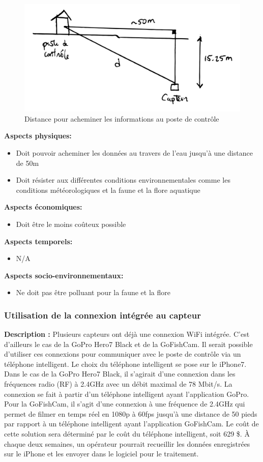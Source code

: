 \begin{figure}[!htb]
    \centering
    \includegraphics[width=0.5\linewidth]{fig/distance_min.png}
    \caption{Distance pour acheminer les informations au poste de contrôle}
    \label{fig:distance_acheminer}
\end{figure}


 \textbf{Aspects physiques:}
 \begin{itemize} [label = {--}]
    \item Doit pouvoir acheminer les données au travers de l'eau jusqu'à une distance de 50m
    \item Doit résister aux différentes conditions environnementales comme les conditions météorologiques et la faune et la flore aquatique
\end{itemize}

 \textbf{Aspects économiques:}
 \begin{itemize} [label = {--}]
    \item Doit être le moins coûteux possible 
\end{itemize}

 \textbf{Aspects temporels:}
 \begin{itemize} [label = {--}]
    \item N/A
\end{itemize}

 \textbf{Aspects socio-environnementaux:}
 \begin{itemize} [label = {--}]
    \item Ne doit pas être polluant pour la faune et la flore
\end{itemize}

\subsubsection{Utilisation de la connexion intégrée au capteur}
\textbf{Description :} Plusieurs capteurs ont déjà une connexion WiFi intégrée. C'est d'ailleurs le cas de la GoPro Hero7 Black et de la GoFishCam. Il serait possible d'utiliser ces connexions pour communiquer avec le poste de contrôle via un téléphone intelligent. Le choix du téléphone intelligent se pose sur le iPhone7. Dans le cas de la GoPro Hero7 Black, il s'agirait d'une connexion dans les fréquences radio (RF) à 2.4GHz avec un débit maximal de 78 Mbit/s. La connexion se fait à partir d'un téléphone intelligent ayant l'application GoPro. Pour la GoFishCam, il s'agit d'une connexion à une fréquence de 2.4GHz qui permet de filmer en temps réel en 1080p à 60fps jusqu'à une distance de 50 pieds par rapport à un téléphone intelligent ayant l'application GoFishCam. Le coût de cette solution sera déterminé par le coût du téléphone intelligent, soit 629 \$. À chaque deux semaines, un opérateur pourrait recueillir les données enregistrées sur le iPhone et les envoyer dans le logiciel pour le traitement.
 
